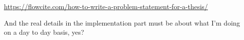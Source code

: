 \url{https://flowcite.com/how-to-write-a-problem-statement-for-a-thesis/}

And the real details in the implementation part must be about what I'm doing on a day to day basis, yes?
